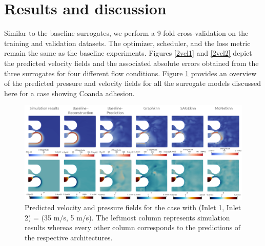 \section{Results and discussion}
Similar to the baseline surrogates, we perform a 9-fold cross-validation on the training and validation datasets. The optimizer, scheduler, and the loss metric remain the same as the baseline experiments.  Figures \ref{2vel1} and \ref{2vel2} depict the predicted velocity fields and the associated absolute errors obtained from the three surrogates for four different flow conditions. Figure \ref{aloop} provides an overview of the predicted pressure and velocity fields for all the surrogate models discussed here for a case showing Coanda adhesion. \\
\begin{figure}[ht]
    \centering
    \includegraphics[width=16cm]{images/Methodology/presvelcomp.png}
    \caption{Predicted velocity and pressure fields for the case with (Inlet 1, Inlet 2) = (35 m/s, 5 m/s). The leftmost column represents simulation results whereas every other column corresponds to the predictions of the respective architectures.} 
    \label{aloop}
\end{figure}
